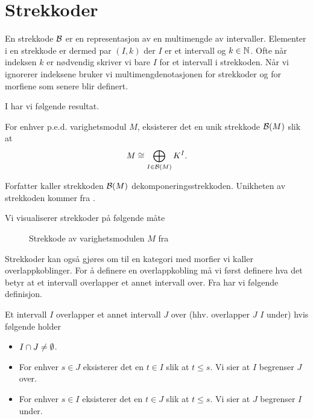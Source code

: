 \section{Strekkoder}\label{sek:Barc}
En strekkode $\mathcal{B}$ er en representasjon av en multimengde
av intervaller. Elementer i en strekkode er dermed par
$(I,k)$ der $I$ er et intervall og $k\in\mathbb{N}$. Ofte når
indeksen $k$ er nødvendig skriver vi bare $I$ for et
intervall i strekkoden. Når vi ignorerer indeksene bruker vi multimengdenotasjonen for
strekkoder og for morfiene som senere blir definert.

I \citep[teorem 2.4]{Bauer2020} har vi følgende resultat.
\begin{teorem}\label{trm:DekompBark}
  For enhver p.e.d. varighetsmodul $M$, eksisterer det en
  unik strekkode $\mathcal{B}(M)$ slik at
  \[M\cong \bigoplus_{I\in\mathcal{B}(M)} K^I.\]
\end{teorem}
Forfatter kaller strekkoden $\mathcal{B}(M)$
dekomponeringsstrekkoden. Unikheten av strekkoden kommer
fra \citep[teorem 2.7]{Schenck2022}.

Vi visualiserer strekkoder på følgende måte
\begin{figure}[h]
  \centering
  \scalebox{0.5}{
    }
  \caption{Strekkode av varighetsmodulen $M$ fra
  }
  \label{fig:varmodstrek}
\end{figure}

%

Strekkoder kan også gjøres om til en kategori med morfier
vi kaller overlappkoblinger. For å definere en overlappkobling
må vi først definere hva det betyr at et intervall
overlapper et annet intervall over. Fra \citep[seksjon
2.3]{Bauer2020}
har vi følgende definisjon.

\begin{definisjon}
    Et intervall $I$ overlapper et annet intervall $J$
    over (hhv. overlapper $J$  $I$ under) hvis følgende
    holder
    \begin{itemize}
        \item $I\cap J\neq\emptyset$.
        \item For enhver $s\in J$ eksisterer det en $t\in I$ slik at $t\leq s$. Vi sier at $I$ begrenser $J$ over.
        \item For enhver $s\in I$ eksisterer det en $t\in J$ slik at $t\leq s$. Vi sier at $J$ begrenser $I$ under.
    \end{itemize}
\end{definisjon}

